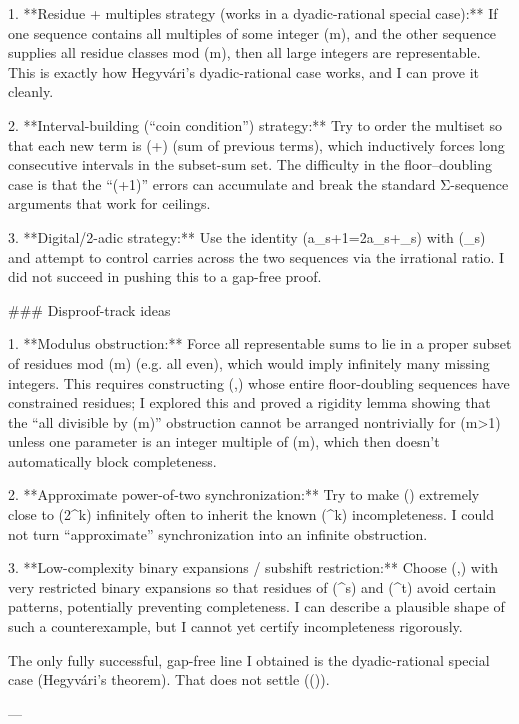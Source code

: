 1. **Residue + multiples strategy (works in a dyadic-rational special case):**
   If one sequence contains all multiples of some integer (m), and the other sequence supplies all residue classes mod (m), then all large integers are representable. This is exactly how Hegyvári’s dyadic-rational case works, and I can prove it cleanly.

2. **Interval-building (“coin condition”) strategy:**
   Try to order the multiset so that each new term is (+) (sum of previous terms), which inductively forces long consecutive intervals in the subset-sum set. The difficulty in the floor–doubling case is that the “(+1)” errors can accumulate and break the standard Σ-sequence arguments that work for ceilings.

3. **Digital/2-adic strategy:**
   Use the identity (a_{s+1}=2a_s+\varepsilon_s) with (\varepsilon_s) and attempt to control carries across the two sequences via the irrational ratio. I did not succeed in pushing this to a gap-free proof.

### Disproof-track ideas

1. **Modulus obstruction:**
   Force all representable sums to lie in a proper subset of residues mod (m) (e.g. all even), which would imply infinitely many missing integers. This requires constructing (\alpha,\beta) whose entire floor-doubling sequences have constrained residues; I explored this and proved a rigidity lemma showing that the “all divisible by (m)” obstruction cannot be arranged nontrivially for (m>1) unless one parameter is an integer multiple of (m), which then doesn’t automatically block completeness.

2. **Approximate power-of-two synchronization:**
   Try to make (\beta) extremely close to (2^k\alpha) infinitely often to inherit the known (^k\alpha) incompleteness. I could not turn “approximate” synchronization into an infinite obstruction.

3. **Low-complexity binary expansions / subshift restriction:**
   Choose (\alpha,\beta) with very restricted binary expansions so that residues of (^s\alpha\rfloor) and (^t\beta\rfloor) avoid certain patterns, potentially preventing completeness. I can describe a plausible shape of such a counterexample, but I cannot yet certify incompleteness rigorously.

The only fully successful, gap-free line I obtained is the dyadic-rational special case (Hegyvári’s theorem). That does not settle ((\star)).

---

